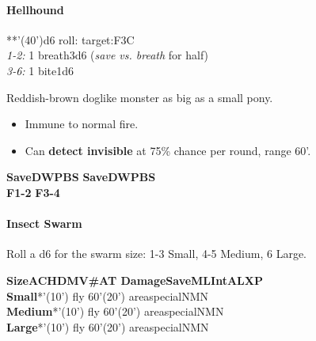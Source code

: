 \documentclass[english,11pt,openany,letterpaper,twocolumn]{book}
\begin{document}
\skipline\skipline
\hypertarget{hellhound}{}
\paragraph{Hellhound}
**'(40')\tab d6 roll: target:\tab F3\tab C
\\\textit{1-2:} 1 breath\tab 3d6 (\emph{save vs. breath} for half)
\\\textit{3-6:} 1 bite1d6

Reddish-brown doglike monster as big as a small pony.
\begin{itemize}[leftmargin=*,label=\itshape\textbullet]
\item
Immune to normal fire.
\item
Can \textbf{detect invisible} at 75\% chance per round, range 60'.
\end{itemize}


\vfill


\tab
\overprintw[24\charwidth]{\_}%
\textbf{Save\tab D\tab W\tab P\tab B\tab S}\tab
\overprintw[24\charwidth]{\_}%
\textbf{Save\tab D\tab W\tab P\tab B\tab S}\\
\tab\textbf{F1-2}
\tab\textbf{F3-4}

\break


\hypertarget{swarm}{}
\paragraph{Insect Swarm}

Roll a d6 for the swarm size: 1-3 Small, 4-5 Medium, 6 Large.

%

\ulf\textbf{Size\tab AC\tab HD\tab MV\tab \#AT \tab Damage\tab Save\tab ML\tab Int\tab AL\tab XP}\\%
\textbf{Small}*'(10') fly 60'(20') area\tab special\tab NM\tab N\\%
\textbf{Medium}*'(10') fly 60'(20') area\tab special\tab NM\tab N\\%
\ulf\textbf{Large}*'(10') fly 60'(20') area\tab special\tab NM\tab N\\%
\end{document}
